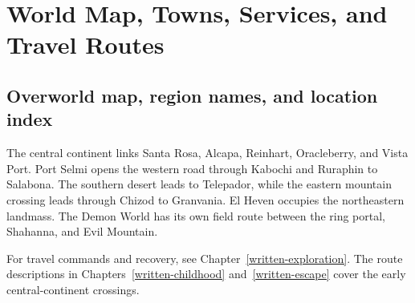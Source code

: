 \chapter{World Map, Towns, Services, and Travel Routes}
\label{written-world-atlas}

\section{Overworld map, region names, and location index}
The central continent links Santa Rosa, Alcapa, Reinhart, Oracleberry, and Vista Port. Port Selmi opens the western road through Kabochi and Ruraphin to Salabona. The southern desert leads to Telepador, while the eastern mountain crossing leads through Chizod to Granvania. El Heven occupies the northeastern landmass. The Demon World has its own field route between the ring portal, Shahanna, and Evil Mountain.

For travel commands and recovery, see Chapter~\ref{written-exploration}. The route descriptions in Chapters~\ref{written-childhood} and~\ref{written-escape} cover the early central-continent crossings.

